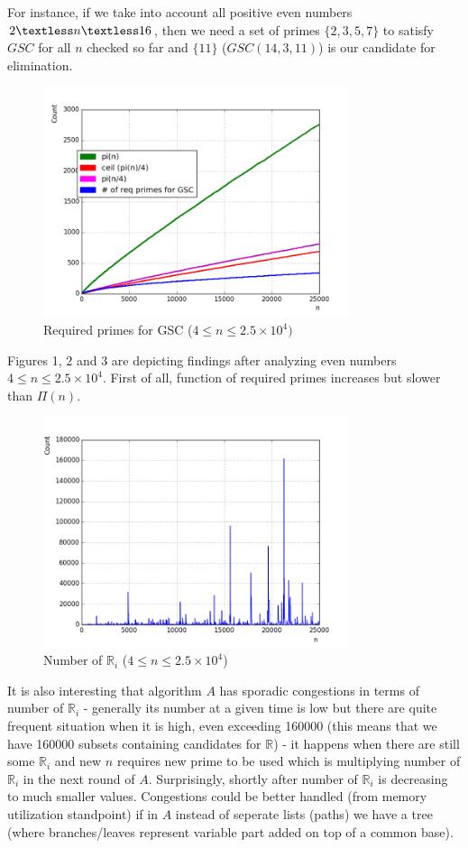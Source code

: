 \documentclass[10pt,twocolumn]{article}
\begin{document}
For instance, if we take into account all positive even numbers $2 \textless n \textless 16$, then we need a set of primes $\{2,3,5,7\}$ to satisfy $GSC$ for all $n$ checked so far and $\{11\}$ ($GSC(14, 3, 11)$) is our candidate for elimination.	

\begin{figure}[!ht]
\centering
\captionsetup{justification=centering}
\includegraphics[width=9cm]{f_required_primes}
\caption[caption]{Required primes for GSC ($4 \leq n \leq 2.5 \times 10^4)$}
\label{fig:requiredprimes}
\end{figure}	

Figures 1, 2 and 3 are depicting findings after analyzing even numbers $4 \leq n \leq 2.5 \times 10^4$. First of all, function of required primes increases but slower than $\Pi(n)$.

\begin{figure}[!ht]
\centering
\captionsetup{justification=centering}
\includegraphics[width=9cm]{f_number_of_possible_sets}
\caption[caption]{Number of $\mathbb{R}_i$ ($4 \leq n \leq 2.5 \times 10^4$)}
\label{fig:numberofsets}
\end{figure}

It is also interesting that algorithm $A$ has sporadic congestions in terms of number of $\mathbb{R}_i$ - generally its number at a given time is low but there are quite frequent situation when it is high, even exceeding 160000 (this means that we have 160000 subsets containing candidates for $\mathbb{R}$) - it happens when there are still some $\mathbb{R}_i$ and new $n$ requires new prime to be used which is multiplying number of $\mathbb{R}_i$ in the next round of $A$. Surprisingly, shortly after number of $\mathbb{R}_i$ is decreasing to much smaller values. Congestions could be better handled (from memory utilization standpoint) if in $A$ instead of seperate lists (paths) we have a tree (where branches/leaves represent variable part added on top of a common base).
\end{document}
